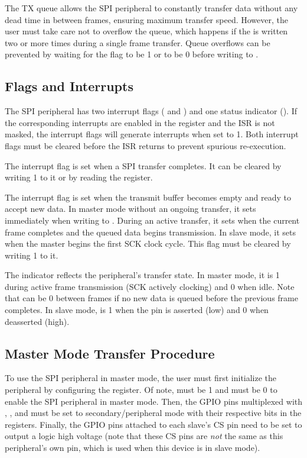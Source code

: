 The TX queue allows the SPI peripheral to constantly transfer data without any dead time in between frames, ensuring maximum transfer speed. However, the user must take care not to overflow the queue, which happens if the  is written two or more times during a single frame transfer. Queue overflows can be prevented by waiting for the  flag to be 1 or  to be 0 before writing to .


\subsection{Flags and Interrupts}

The SPI peripheral has two interrupt flags ( and ) and one status indicator (). If the corresponding interrupts are enabled in the  register and the  ISR is not masked, the interrupt flags will generate interrupts when set to 1. Both interrupt flags must be cleared before the ISR returns to prevent spurious re-execution.

The  interrupt flag is set when a SPI transfer completes. It can be cleared by writing 1 to it or by reading the  register.

The  interrupt flag is set when the  transmit buffer becomes empty and ready to accept new data. In master mode without an ongoing transfer, it sets immediately when writing to . During an active transfer, it sets when the current frame completes and the queued data begins transmission. In slave mode, it sets when the master begins the first SCK clock cycle. This flag must be cleared by writing 1 to it.

The  indicator reflects the peripheral's transfer state. In master mode, it is 1 during active frame transmission (SCK actively clocking) and 0 when idle. Note that  can be 0 between frames if no new data is queued before the previous frame completes. In slave mode,  is 1 when the  pin is asserted (low) and 0 when deasserted (high).

\subsection{Master Mode Transfer Procedure}

To use the SPI peripheral in master mode, the user must first initialize the  peripheral by configuring the  register. Of note,  must be 1 and  must be 0 to enable the SPI peripheral in master mode. Then, the GPIO pins multiplexed with , , and  must be set to secondary/peripheral mode with their respective bits in the  registers. Finally, the GPIO pins attached to each slave's CS pin need to be set to output a logic high voltage (note that these CS pins are \textit{not} the same as this  peripheral's own  pin, which is used when this device is in slave mode).

